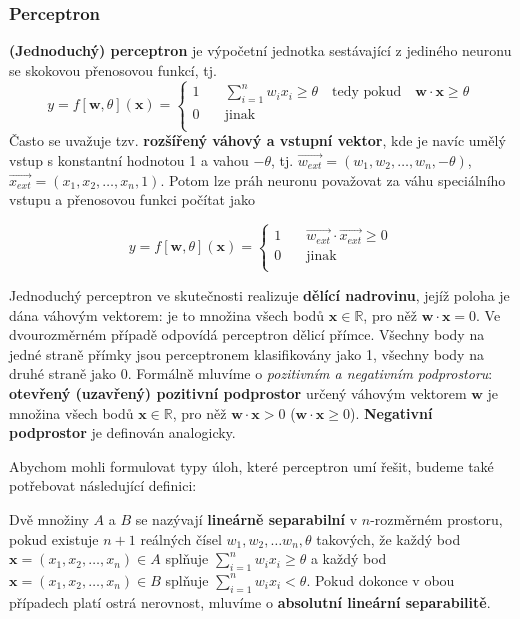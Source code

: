\documentclass[11pt]{report} %
\newcommand{\R}{\mathbb{R}}
\renewcommand{\vec}[1]{\mathbf{#1}}
\begin{document}
\subsubsection{Perceptron}
\textbf{(Jednoduchý) perceptron} je výpočetní jednotka sestávající z jediného neuronu se skokovou přenosovou funkcí, tj.
\[
y = f[\vec{w},\theta](\vec{x}) = 
\begin{cases}
1 	& \quad \sum\limits_{i=1}^n w_i x_i \geq \theta \quad \text{tedy pokud} \quad \vec{w}\cdot\vec{x} \geq \theta\\
0 	& \quad \text{jinak}\\
\end{cases}
\]
Často se uvažuje tzv. \textbf{rozšířený váhový a vstupní vektor}, kde je navíc umělý vstup s konstantní hodnotou 1 a vahou $-\theta$, tj. $\overrightarrow{w_{ext}} = (w_1, w_2, \dots, w_n, -\theta)$, $\overrightarrow{x_{ext}} = (x_1, x_2, \dots, x_n, 1)$. Potom lze práh neuronu považovat za váhu speciálního vstupu a přenosovou funkci počítat jako 

\[
y = f[\vec{w},\theta](\vec{x}) = 
\begin{cases}
1 	& \quad \overrightarrow{w_{ext}}\cdot\overrightarrow{x_{ext}} \geq 0\\
0 	& \quad \text{jinak}\\
\end{cases}
\]

Jednoduchý perceptron ve skutečnosti realizuje \textbf{dělící nadrovinu}, jejíž poloha je dána váhovým vektorem: je to množina všech bodů $\vec{x} \in \R$, pro něž $\vec{w}\cdot\vec{x} = 0$. Ve dvourozměrném případě odpovídá perceptron dělicí přímce. Všechny body na jedné straně přímky jsou perceptronem klasifikovány jako 1, všechny body na druhé straně jako 0. Formálně mluvíme o \textit{pozitivním a negativním podprostoru}: \textbf{otevřený (uzavřený) pozitivní podprostor} určený váhovým vektorem $\vec{w}$ je množina všech bodů $\vec{x} \in \R$, pro něž $\vec{w}\cdot\vec{x} > 0$ ($\vec{w}\cdot\vec{x} \geq 0$). \textbf{Negativní podprostor} je definován analogicky.

Abychom mohli formulovat typy úloh, které perceptron umí řešit, budeme také potřebovat následující definici:

Dvě množiny $A$ a $B$ se nazývají \textbf{lineárně separabilní} v $n$-rozměrném prostoru, pokud existuje $n+1$ reálných čísel $w_1, w_2, \dots w_n, \theta$ takových, že každý bod $\vec{x} = (x_1, x_2, \dots, x_n) \in A$ splňuje $\sum\limits_{i=1}^n w_i x_i \geq \theta$ a každý bod $\vec{x} = (x_1, x_2, \dots, x_n) \in B$ splňuje $\sum\limits_{i=1}^n w_i x_i < \theta$. Pokud dokonce v obou případech platí ostrá nerovnost, mluvíme o \textbf{absolutní lineární separabilitě}. 
\end{document}
